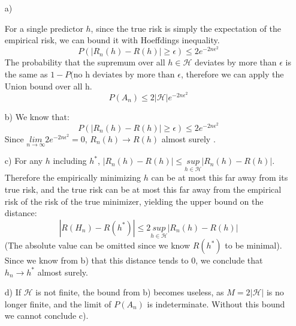 \documentclass[10pt]{article}
\numberwithin{equation}{section}
\begin{document}
\begin{enumerate}
\item[a)]{
    For a single predictor $h$, since the true risk is simply the expectation of the empirical risk, we can bound it with Hoeffdings inequality.
    $$P(|R_n(h) - R(h)| \geq \epsilon) \leq 2e^{-2n\epsilon^2}$$
    The probability that the supremum over all $h\in \mathcal{H}$ deviates by more than $\epsilon$ is the same as $1-P(\text{no h deviates by more than }\epsilon$, therefore we can apply the Union bound over all h.
    $$P(A_n) \leq 2|\mathcal{H}| e^{-2n\epsilon^2}$$

}
\item[b)]{
    We know that:
    $$P(|R_n(h) - R(h)| \geq \epsilon) \leq 2e^{-2n\epsilon^2}$$
    Since $\underset{n\rightarrow \infty}{lim} 2e^{-2n\epsilon^2} = 0$, $R_n(h) \rightarrow R(h)$ almost surely .
}
\item[c)]{
    For any $h$ including $h^*$, $|R_n(h)-R(h)| \leq \underset{h\in \mathcal{H}}{sup} |R_n(h)-R(h)|$.
    Therefore the empirically minimizing $h$ can be at most this far away from its true risk, and the true risk can be at most this far away from the empirical risk of the risk of the true minimizer, yielding the upper bound on the distance:
    $$|R(H_n) - R(h^*)| \leq 2\underset{h\in \mathcal{H}}{sup} |R_n(h)-R(h)|$$
    (The absolute value can be omitted since we know $R(h^*)$ to be minimal).
    Since we know from b) that this distance tends to 0, we conclude that $h_n \rightarrow h^*$ almost surely.
}
\item[d)]{
    If $\mathcal{H}$ is not finite, the bound from b) becomes useless, as $M=2|\mathcal{H}|$ is no longer finite, and the limit of $P(A_n)$ is indeterminate.
    Without this bound we cannot conclude c).
  }
\end{enumerate}
\end{document}
